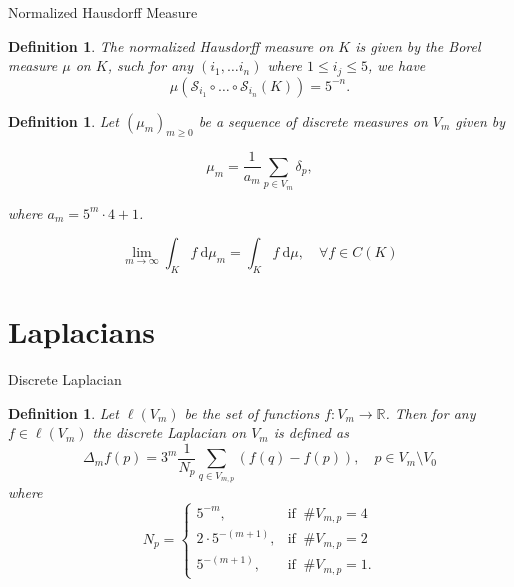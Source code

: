 \documentclass{beamer}
\newcounter{chapCount}
\newtheorem{defi}[theorems]{Definition}
\newcommand{\func}[3]{#1\colon #2 \to #3} %
\newcommand{\ree}{\mathbb{R}}
\newcommand{\cd}{\cdot}
\newcommand{\fracConst}{\mathcal{S}}
\newcommand{\dd}{\ \text{d}}
\begin{document}
	
	\begin{frame}{Normalized Hausdorff Measure}
		
		\vspace{2em}
		\begin{defi}\label{normalziedHausdorffMeasure}
			The \emph{normalized Hausdorff measure} on $K$ is given by the Borel measure $\mu$ on $K$, such for any $(i_1, \ldots i_n)$ where $1 \leq i_j \leq 5$, we have
						\vspace{-0.5em}
			\begin{equation}
				\mu\left(\fracConst_{i_1} \circ \ldots \circ \fracConst_{i_n}(K)\right) = 5^{-n}.
			\end{equation}
		\end{defi}
		
		\pause 
		
		\begin{defi} Let $(\mu_{m})_{m \geq 0}$ be a sequence of discrete measures on $V_m$ given by
			
			\vspace{-0.5em}
			\begin{equation}\label{discreteMeasures}
				\mu_m = \frac{1}{a_m} \sum_{p \in V_m} \delta_p,
			\end{equation}
			
			\vspace{-1em}
			where $a_m = 5^{m}\cd 4 + 1$. 
		\end{defi}
		
		\vspace{-1em}
		\begin{equation}
				\lim_{m \to \infty} \int_{K}f \dd \mu_m = \int_{K} f \dd \mu, \quad \forall f \in C(K)
		\end{equation}
	
	\vspace{-2em}
	\end{frame}
	
	
	\section{Laplacians}
	\begin{frame}{Discrete Laplacian}
		
		\vspace{2em}
		
		\setcounter{theorems}{0}
		\setcounter{chapCount}{2}
		\begin{defi}\label{discreteLaplacian}
			Let $\ell(V_m)$ be the set of functions $\func{f}{V_m}{\ree}$. Then for any $f \in \ell(V_m)$  the \emph{discrete Laplacian} on $V_m$ is defined as
			\begin{equation}
				\Delta_m f(p) = 3^{m} \frac{1}{N_p}\sum_{q \in V_{m,p}} (f(q) - f(p)), \quad p \in V_m \setminus V_0
			\end{equation}
			where $$N_p = \begin{cases}
				5^{-m}, & \text{if } \ \# V_{m,p} = 4 \\
				2\cd 5^{-(m+1)}, & \text{if } \ \# V_{m,p} = 2\\
				5^{-(m+1)},  & \text{if } \ \# V_{m,p} = 1.
			\end{cases}$$
		\end{defi}
	\end{frame}
	
\end{document}
